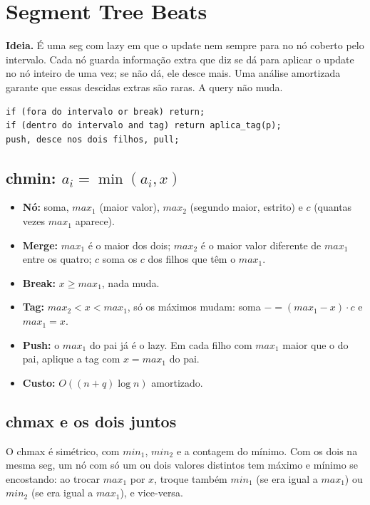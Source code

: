 \section{Segment Tree Beats}

\textbf{Ideia.} É uma seg com lazy em que o update nem sempre para no nó coberto pelo intervalo. Cada nó guarda
informação extra que diz se dá para aplicar o update no nó inteiro de uma vez; se não dá, ele desce mais. Uma
análise amortizada garante que essas descidas extras são raras. A query não muda.
\begin{lstlisting}
if (fora do intervalo or break) return;
if (dentro do intervalo and tag) return aplica_tag(p);
push, desce nos dois filhos, pull;
\end{lstlisting}

\subsection*{chmin: $a_i = \min(a_i, x)$}

\begin{itemize}
  \item \textbf{Nó:} soma, $max_1$ (maior valor), $max_2$ (segundo maior, estrito) e $c$ (quantas vezes $max_1$ aparece).
  \item \textbf{Merge:} $max_1$ é o maior dos dois; $max_2$ é o maior valor diferente de $max_1$ entre os quatro; $c$
        soma os $c$ dos filhos que têm o $max_1$.
  \item \textbf{Break:} $x \ge max_1$, nada muda.
  \item \textbf{Tag:} $max_2 < x < max_1$, só os máximos mudam: soma $\mathrel{-}= (max_1 - x) \cdot c$ e $max_1 = x$.
  \item \textbf{Push:} o $max_1$ do pai já é o lazy. Em cada filho com $max_1$ maior que o do pai, aplique a tag com
        $x = max_1$ do pai.
  \item \textbf{Custo:} $O((n + q) \log n)$ amortizado.
\end{itemize}

\subsection*{chmax e os dois juntos}

O chmax é simétrico, com $min_1$, $min_2$ e a contagem do mínimo. Com os dois na mesma seg, um nó com só um ou dois
valores distintos tem máximo e mínimo se encostando: ao trocar $max_1$ por $x$, troque também $min_1$ (se era igual
a $max_1$) ou $min_2$ (se era igual a $max_1$), e vice-versa.

